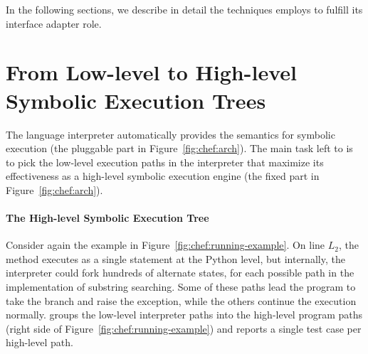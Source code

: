 In the following sections, we describe in detail the techniques \chef employs to fulfill its interface adapter role.


\section{From Low-level to High-level Symbolic Execution Trees}

The language interpreter automatically provides the semantics for symbolic execution (the pluggable part in Figure~\ref{fig:chef:arch}).  The main task left to \chef is to pick the low-level execution paths in the interpreter that maximize its effectiveness as a high-level symbolic execution engine (the fixed part in Figure~\ref{fig:chef:arch}).
%


\paragraph{The High-level Symbolic Execution Tree}

Consider again the example in Figure~\ref{fig:chef:running-example}.  On line $L_2$, the  method executes as a single statement at the Python level, but internally, the interpreter could fork hundreds of alternate states, for each possible path in the implementation of substring searching.
%
Some of these paths lead the program to take the branch and raise the exception, while the others continue the execution normally.
%
\chef groups the low-level interpreter paths into the high-level program paths (right side of Figure~\ref{fig:chef:running-example}) and reports a single test case per high-level path.


